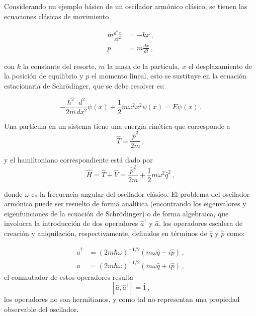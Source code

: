 Considerando un ejemplo básico de un oscilador armónico clásico, se tienen las ecuaciones clásicas de movimiento

\begin{align}
  m \frac{d^2x}{xt^2} & = -kx \,, \label{OA.2}            \\
  p                   & = m\frac{dx}{dt} \,, \label{OA.3}
\end{align}

con $k$ la constante del resorte, $m$ la masa de la partícula, $x$ el desplazamiento de la posición de equilibrio y $p$ el momento lineal, esto se sustituye en la ecuación estacionaria de Schrödinger, que se debe resolver es:

\begin{equation}
  \label{OA.4}
  -\frac{\hbar^2}{2m}\frac{d^2}{dx^2}\psi(x) + \frac{1}{2}m \omega^2 x^2 \psi(x) = E \psi(x) \,.
\end{equation}

Una partícula en un sistema tiene una energía cinética que corresponde a
\begin{equation*}
  \hat{T} = \frac{\hat{p}^2}{2m}\,,
\end{equation*}

y el hamiltoniano correspondiente está dado por
\begin{equation}
  \hat{H} = \hat{T} + \hat{V} = \frac{\hat{p}^2}{2m} +\frac{1}{2} m\omega^2 \hat{q}^2 \label{OA.5}\,,
\end{equation}


donde $\omega$ es la frecuencia angular del oscilador clásico.
El problema del oscilador armónico puede ser resuelto de forma analítica (encontrando los eigenvalores y eigenfunciones de la ecuación de Schrödinger) o de forma algebraica, que involucra la introducción de dos operadores $\hat{a}^{\dagger}$ y $\hat{a}$, los operadores escalera de creación y aniquilación, respectivamente, definidos en términos de $\hat{q}$ y $\hat{p}$ como:

\begin{align}
  \hat{a}^{\dagger} & = (2m\hbar\omega)^{-1/2}(m\omega \hat{q} - i\hat{p})\label{OA.6} \,,   \\
  \hat{a}           & = (2m\hbar \omega)^{-1/2}(m\omega \hat{q} + i \hat{p})\label{OA.7} \,,
\end{align}
el conmutador de estos operadores resulta
\begin{equation}
  \label{OA.8}
  [\hat{a}, \hat{a}^{\dagger}] = \hat{1} \,,
\end{equation}
los operadores no son hermitianos, y como tal no representan una propiedad observable del oscilador. %

